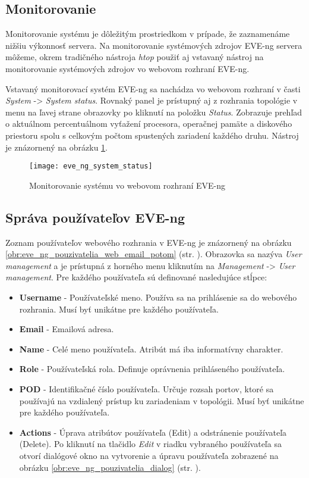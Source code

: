 \subsection{Monitorovanie}

Monitorovanie systému je dôležitým prostriedkom v prípade, že zaznamenáme nižšiu výkonnosť servera. Na monitorovanie systémových zdrojov EVE-ng servera môžeme, okrem tradičného nástroja \emph{htop} použiť aj vstavaný nástroj na monitorovanie systémových zdrojov vo webovom rozhraní EVE-ng.

Vstavaný monitorovací systém EVE-ng sa nachádza vo webovom rozhraní v časti \emph{System} -> \emph{System status}. Rovnaký panel je prístupný aj z rozhrania topológie v menu na ľavej strane obrazovky po kliknutí na položku \emph{Status}. Zobrazuje prehľad o aktuálnom percentuálnom vyťažení procesora, operačnej pamäte a diskového priestoru spolu s celkovým počtom spustených zariadení každého druhu. Nástroj je znázornený na obrázku \ref{obr:eve_ng_system_status}.

\begin{figure}
    \centering
    \texttt{[image: eve\_ng\_system\_status]}
    \caption{Monitorovanie systému vo webovom rozhraní EVE-ng}
    \label{obr:eve_ng_system_status}
\end{figure}




\subsection{Správa používateľov EVE-ng}

Zoznam používateľov webového rozhrania v EVE-ng je znázornený na obrázku \ref{obr:eve_ng_pouzivatelia_web_email_potom} (str. \pageref{obr:eve_ng_pouzivatelia_web_email_potom}). Obrazovka sa nazýva \emph{User management} a je prístupná z horného menu kliknutím na \emph{Management} -> \emph{User management}. Pre každého používateľa sú definované nasledujúce stĺpce:

\begin{itemize}[noitemsep]
    \item \textbf{Username} - Používateľské meno. Používa sa na prihlásenie sa do webového rozhrania. Musí byť unikátne pre každého používateľa.
    \item \textbf{Email} - Emailová adresa.
    \item \textbf{Name} - Celé meno používateľa. Atribút má iba informatívny charakter.
    \item \textbf{Role} - Používateľská rola. Definuje oprávnenia prihláseného používateľa.
    \item \textbf{POD} - Identifikačné číslo používateľa. Určuje rozsah portov, ktoré sa používajú na vzdialený prístup ku zariadeniam v topológii. Musí byť unikátne pre každého používateľa.
    \item \textbf{Actions} - Úprava atribútov používateľa (Edit) a odstránenie používateľa (Delete). Po kliknutí na tlačidlo \emph{Edit} v riadku vybraného používateľa sa otvorí dialógové okno na vytvorenie a úpravu používateľa zobrazené na obrázku \ref{obr:eve_ng_pouzivatelia_dialog} (str. \pageref{obr:eve_ng_pouzivatelia_dialog}).
\end{itemize}

